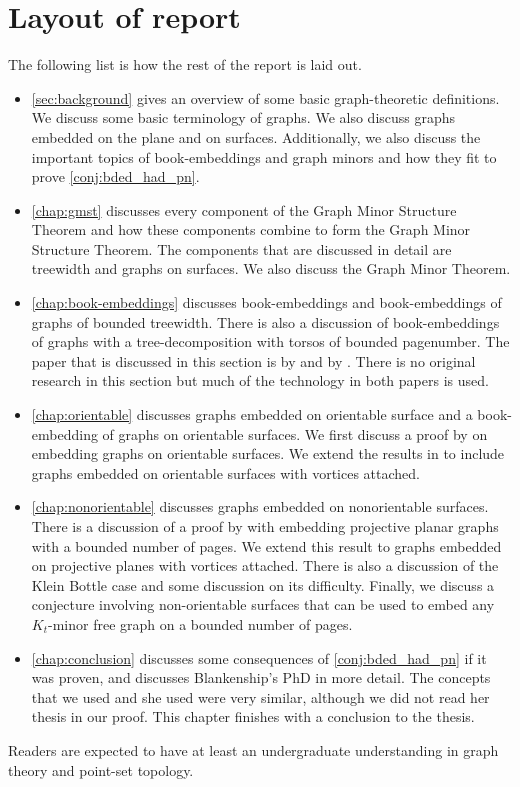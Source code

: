 \section{Layout of report}
The following list is how the rest of the report is laid out. 
\begin{itemize}
	\item \cref{sec:background} gives an overview of some basic graph-theoretic definitions. We discuss some basic terminology of graphs. We also discuss graphs embedded on the plane and on surfaces. Additionally, we also discuss the important topics of book-embeddings and graph minors and how they fit to prove \cref{conj:bded_had_pn}. 
	\item \cref{chap:gmst} discusses every component of the Graph Minor Structure Theorem and how these components combine to form the Graph Minor Structure Theorem. The components that are discussed in detail are treewidth and graphs on surfaces. We also discuss the Graph Minor Theorem. 
	\item \cref{chap:book-embeddings} discusses book-embeddings and book-embeddings of graphs of bounded treewidth. There is also a discussion of book-embeddings of graphs with a tree-decomposition with torsos of bounded pagenumber. The paper that is discussed in this section is by \textcite{hickingbothamStackNumberCliqueSum2023} and by \textcite{ganleyPagenumberTrees2001}. There is no original research in this section but much of the technology in both papers is used. 
	\item \cref{chap:orientable} discusses graphs embedded on orientable surface and a book-embedding of graphs on orientable surfaces. We first discuss a proof by \textcite{heathPagenumberGenusGraphs1992} on embedding graphs on orientable surfaces. We extend the results in \textcite{heathPagenumberGenusGraphs1992} to include graphs embedded on orientable surfaces with vortices attached. 
	\item \cref{chap:nonorientable} discusses graphs embedded on nonorientable surfaces. There is a discussion of a proof by \textcite{nakamotoBookEmbeddingProjectiveplanar2015} with embedding projective planar graphs with a bounded number of pages. We extend this result to graphs embedded on projective planes with vortices attached. There is also a discussion of the Klein Bottle case and some discussion on its difficulty. Finally, we discuss a conjecture involving non-orientable surfaces that can be used to embed any $K_t$-minor free graph on a bounded number of pages. 
	\item \cref{chap:conclusion} discusses some consequences of \cref{conj:bded_had_pn} if it was proven, and discusses Blankenship's PhD in more detail. The concepts that we used and she used were very similar, although we did not read her thesis in our proof. This chapter finishes with a conclusion to the thesis. 
\end{itemize}

Readers are expected to have at least an undergraduate understanding in graph theory and point-set topology. 
